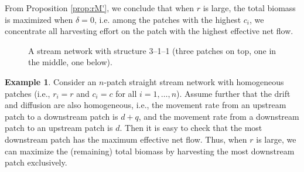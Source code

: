 \documentclass[11pt]{article}
\theoremstyle{definition}
\newtheorem{example}[theorem]{Example}
\begin{document}
From Proposition \ref{prop:rM'}, we conclude that when $r$ is large, the total biomass is maximized when $\delta=0$, i.e. among the patches with the highest $c_i$, we concentrate all harvesting effort on the patch with the highest effective net flow.





\begin{figure}[htbp]
\centering
{}
\caption{A stream network with structure 3–1–1 (three patches on top, one in the middle, one
below).}\label{river}
\end{figure}





\begin{example}
Consider an $n$-patch straight stream network with homogeneous patches (i.e., $r_i=r$ and $c_i=c$ for all $i=1,\dots,n$). Assume further that the drift and diffusion are also homogeneous, i.e., the movement rate from an upstream patch to a downstream patch is $d+q$, and the movement rate from a downstream patch to an upstream patch is $d$. Then it is easy to check that the most downstream patch has the maximum effective net flow. Thus, when $r$ is large, we can maximize the (remaining) total biomass by harvesting the most downstream patch exclusively. 
    
    
\end{example}
\end{document}
